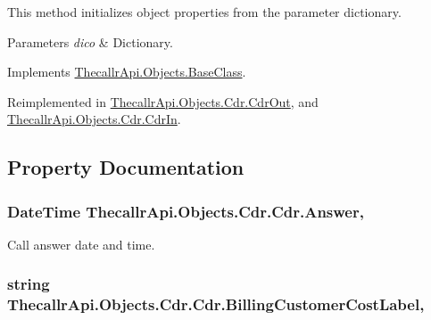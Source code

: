 This method initializes object properties from the parameter dictionary. 


\begin{DoxyParams}{Parameters}
{\em dico} & Dictionary.\\
\hline
\end{DoxyParams}


Implements \hyperlink{class_thecallr_api_1_1_objects_1_1_base_class_a77680f2cb89665fe65039581c7d907d2}{Thecallr\+Api.\+Objects.\+Base\+Class}.



Reimplemented in \hyperlink{class_thecallr_api_1_1_objects_1_1_cdr_1_1_cdr_out_aea66d434d7e9762633a0c59fd4837d2b}{Thecallr\+Api.\+Objects.\+Cdr.\+Cdr\+Out}, and \hyperlink{class_thecallr_api_1_1_objects_1_1_cdr_1_1_cdr_in_a327298c791abec06fab4e425889aa320}{Thecallr\+Api.\+Objects.\+Cdr.\+Cdr\+In}.



\subsection{Property Documentation}
\hypertarget{class_thecallr_api_1_1_objects_1_1_cdr_1_1_cdr_a792393dfcf53621bc1afe4c196bb8125}{
\subsubsection[{Answer}]{\setlength{\rightskip}{0pt plus 5cm}Date\+Time Thecallr\+Api.\+Objects.\+Cdr.\+Cdr.\+Answer\hspace{0.3cm}{\ttfamily [get]}, {\ttfamily [set]}}}\label{class_thecallr_api_1_1_objects_1_1_cdr_1_1_cdr_a792393dfcf53621bc1afe4c196bb8125}


Call answer date and time. 

\hypertarget{class_thecallr_api_1_1_objects_1_1_cdr_1_1_cdr_a92ae341a1305c1d65c441342ec766eb5}{
\subsubsection[{Billing\+Customer\+Cost\+Label}]{\setlength{\rightskip}{0pt plus 5cm}string Thecallr\+Api.\+Objects.\+Cdr.\+Cdr.\+Billing\+Customer\+Cost\+Label\hspace{0.3cm}{\ttfamily [get]}, {\ttfamily [set]}}}\label{class_thecallr_api_1_1_objects_1_1_cdr_1_1_cdr_a92ae341a1305c1d65c441342ec766eb5}


